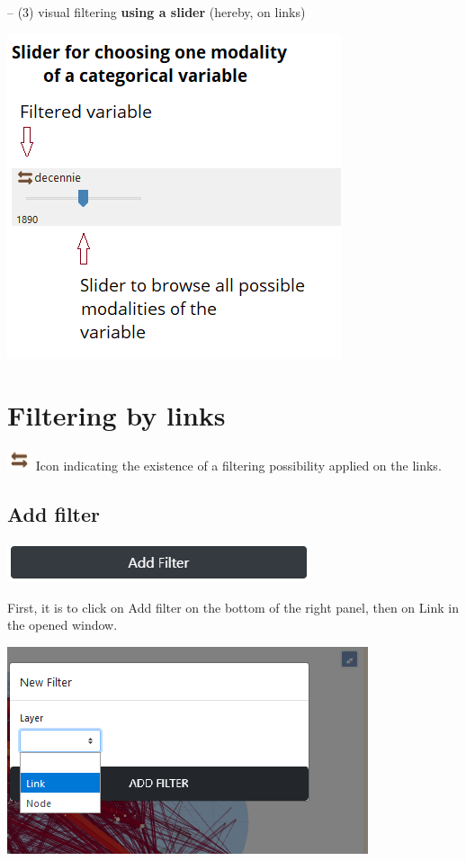 \documentclass[
  letterpaper,
  DIV=11,
  numbers=noendperiod]{scrreprt}
\begin{document}
-- (3) visual filtering \textbf{using a slider} (hereby, on links)

\includegraphics{images/schema_Slider_temp.png}

\section{Filtering by links}\label{filtering-by-links}

\includegraphics{images/icon_links_filtering.png} Icon indicating the
existence of a filtering possibility applied on the links.

\subsection{Add filter}\label{add-filter}

\includegraphics{images/Add_filter.PNG}

First, it is to click on Add filter on the bottom of the right panel,
then on Link in the opened window.

\includegraphics{images/Add_filter_links1.png}
\end{document}
